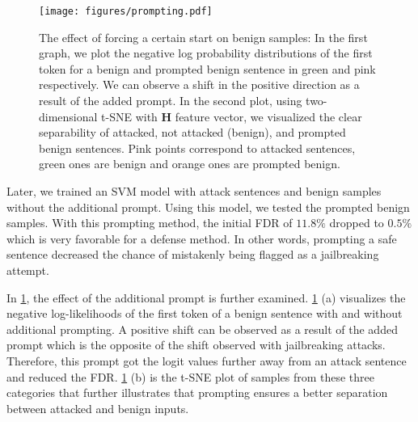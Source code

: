\begin{figure}[tb]
\centering
\texttt{[image: figures/prompting.pdf]}
\vspace{-10pt}
    \caption{The effect of forcing a certain start on benign samples: In the first graph, we plot the negative log probability distributions of the first token for a benign and prompted benign sentence in green and pink respectively. We can observe a shift in the positive direction as a result of the added prompt. In the second plot, using two-dimensional t-SNE with $\bm{H}$ feature vector, we visualized the clear separability of attacked, not attacked (benign), and prompted benign sentences. Pink points correspond to attacked sentences, green ones are benign and orange ones are prompted benign. }
\label{fig:sure}
\end{figure}

Later, we trained an SVM model with \vicuna{} attack sentences and benign samples without the additional prompt. Using this model, we tested the prompted benign samples. With this prompting method, the initial FDR of $11.8\%$ dropped to $0.5\%$ which is very favorable for a defense method. In other words, prompting a safe sentence decreased the chance of mistakenly being flagged as a jailbreaking attempt.

In \cref{fig:sure}, the effect of the additional prompt is further examined. \cref{fig:sure} (a) visualizes the negative log-likelihoods of the first token of a benign sentence with and without additional prompting. A positive shift can be observed as a result of the added prompt which is the opposite of the shift observed with jailbreaking attacks. Therefore, this prompt got the logit values further away from an attack sentence and reduced the FDR.  \cref{fig:sure} (b) is the t-SNE plot of samples from these three categories that further illustrates that prompting ensures a better separation between attacked and benign inputs. 

\subsection{}
\label{app:log_dist}


